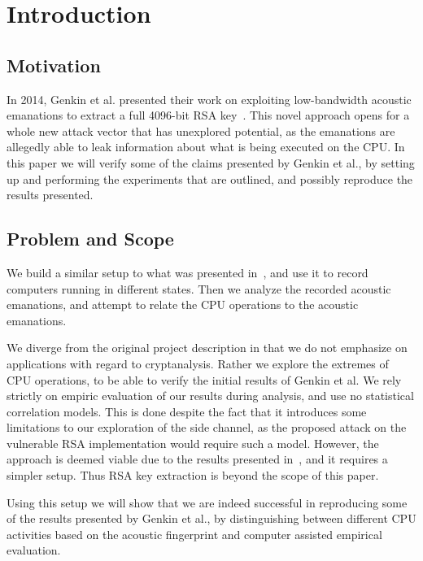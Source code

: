 \chapter{Introduction}\label{chp:introduction} 

\section{Motivation}
In 2014, Genkin et al. presented their work on exploiting low-bandwidth acoustic emanations to extract a full 4096-bit RSA key~\cite{DBLP:conf/crypto/GenkinST14}.
This novel approach opens for a whole new attack vector that has unexplored potential, as the emanations are allegedly able to leak information about what is being executed on the CPU.
In this paper we will verify some of the claims presented by Genkin et al., by setting up and performing the experiments that are outlined, and possibly reproduce the results presented.


\section{Problem and Scope}
We build a similar setup to what was presented in~\cite{DBLP:conf/crypto/GenkinST14}, and use it to record computers running in different states.
Then we analyze the recorded acoustic emanations, and attempt to relate the CPU operations to the acoustic emanations.

We diverge from the original project description in that we do not emphasize on applications with regard to cryptanalysis.
Rather we explore the extremes of CPU operations, to be able to verify the initial results of Genkin et al.
We rely strictly on empiric evaluation of our results during analysis, and use no statistical correlation models.
This is done despite the fact that it introduces some limitations to our exploration of the side channel, as the proposed attack on the vulnerable RSA implementation would require such a model.
However, the approach is deemed viable due to the results presented in~\cite{DBLP:conf/crypto/GenkinST14}, and it requires a simpler setup.
Thus RSA key extraction is beyond the scope of this paper.

Using this setup we will show that we are indeed successful in reproducing some of the results presented by Genkin et al., by distinguishing between different CPU activities based on the acoustic fingerprint and computer assisted empirical evaluation.

